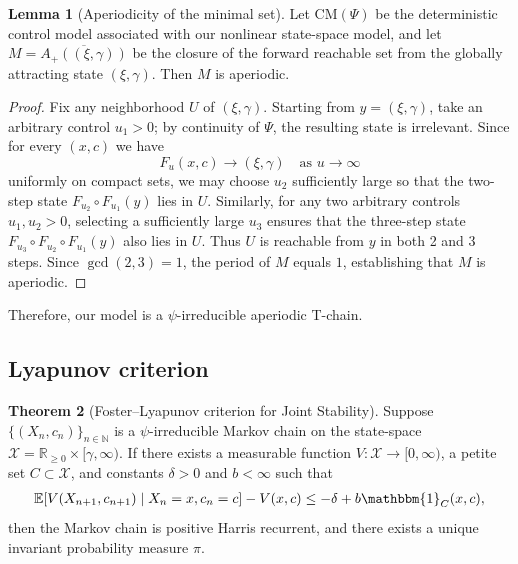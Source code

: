 \documentclass[11pt]{article}
\theoremstyle{definition}
\newtheorem{theorem}{Theorem}
\newtheorem{lemma}[theorem]{Lemma}
\begin{document}
\begin{lemma}[Aperiodicity of the minimal set]
	Let $\mathrm{CM}(\Psi)$ be the deterministic control model associated with our nonlinear state-space model, and let $M = \overline{A_+((\xi,\gamma))}$ be the closure of the forward reachable set from the globally attracting state $(\xi,\gamma)$. Then $M$ is aperiodic.
\end{lemma}

\begin{proof}
	Fix any neighborhood $U$ of $(\xi,\gamma)$.  
	Starting from $y=(\xi,\gamma)$, take an arbitrary control $u_1>0$; by continuity of $\Psi$, the resulting state is irrelevant.  
	Since for every $(x,c)$ we have 
	\[
	F_u(x,c)\to (\xi,\gamma)\quad\text{as }u\to\infty
	\]
	uniformly on compact sets, we may choose $u_2$ sufficiently large so that the two-step state $F_{u_2}\circ F_{u_1}(y)$ lies in $U$.  
	Similarly, for any two arbitrary controls $u_1,u_2>0$, selecting a sufficiently large $u_3$ ensures that the three-step state 
	$F_{u_3}\circ F_{u_2}\circ F_{u_1}(y)$ also lies in $U$.  
	Thus $U$ is reachable from $y$ in both 2 and 3 steps. Since $\gcd(2,3)=1$, the period of $M$ equals $1$, establishing that $M$ is aperiodic.
\end{proof}


Therefore, our model is a $\psi$-irreducible aperiodic T-chain.

\subsection{Lyapunov criterion}

\begin{theorem}[Foster--Lyapunov criterion for Joint Stability]\label{Thm:FL_Joint}
	Suppose $ \{(X_n, c_n)\}_{n \in \mathbb{N}}$ is a $\psi$-irreducible Markov chain on the state-space $\mathcal{X} = \mathbb{R}_{\ge 0} \times [\gamma, \infty)$. If there exists a measurable function $V: \mathcal{X} \to [0, \infty)$, a petite set $C \subset \mathcal{X}$, and constants $\delta > 0$ and $b < \infty$ such that
	\begin{align}
		\mathbb{E}[V(X_{n+1}, c_{n+1}) \mid X_{n} = x, c_n = c ] - V(x, c) \leq - \delta + b \mathbbm{1}_{C}(x, c), \label{Eq:Foster_Joint}
	\end{align}
	then the Markov chain is positive Harris recurrent, and there exists a unique invariant probability measure $\pi$.
\end{theorem}
\end{document}

